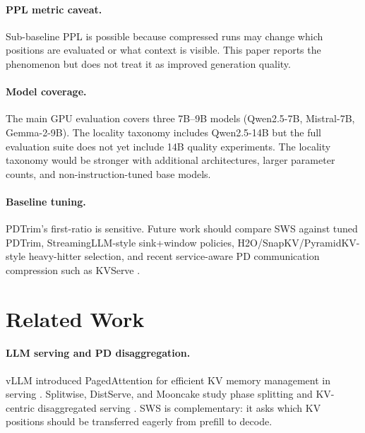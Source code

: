 \documentclass[11pt]{article}
\newcommand{\method}{SWS}
\theoremstyle{definition}
\theoremstyle{plain}
\begin{document}
\paragraph{PPL metric caveat.}
Sub-baseline PPL is possible because compressed runs may change which positions are evaluated or what context is visible.  This paper reports the phenomenon but does not treat it as improved generation quality.

\paragraph{Model coverage.}
The main GPU evaluation covers three 7B--9B models (Qwen2.5-7B, Mistral-7B, Gemma-2-9B).  The locality taxonomy includes Qwen2.5-14B but the full evaluation suite does not yet include 14B quality experiments.  The locality taxonomy would be stronger with additional architectures, larger parameter counts, and non-instruction-tuned base models.

\paragraph{Baseline tuning.}
PDTrim's first-ratio is sensitive.  Future work should compare \method{} against tuned PDTrim, StreamingLLM-style sink+window policies, H2O/SnapKV/PyramidKV-style heavy-hitter selection, and recent service-aware PD communication compression such as KVServe \citep{kvserve}.

\section{Related Work}
\label{sec:related}

\paragraph{LLM serving and PD disaggregation.}
vLLM introduced PagedAttention for efficient KV memory management in serving \citep{vllm}.  Splitwise, DistServe, and Mooncake study phase splitting and KV-centric disaggregated serving \citep{splitwise,distserve,mooncake}.  \method{} is complementary: it asks which KV positions should be transferred eagerly from prefill to decode.
\end{document}

